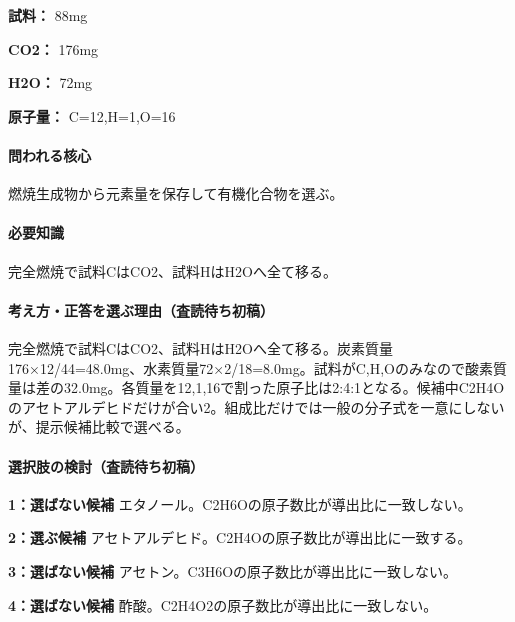 \noindent\textbf{試料：} 88mg\par

\noindent\textbf{CO2：} 176mg\par

\noindent\textbf{H2O：} 72mg\par

\noindent\textbf{原子量：} C=\allowbreak{}12,H=\allowbreak{}1,O=\allowbreak{}16\par

\paragraph{問われる核心} 燃焼生成物から元素量を保存して有機化合物を選ぶ。

\paragraph{必要知識} 完全燃焼で試料CはCO2、試料HはH2Oへ全て移る。

\paragraph{考え方・正答を選ぶ理由（査読待ち初稿）} 完全燃焼で試料CはCO2、試料HはH2Oへ全て移る。炭素質量176×12/44=\allowbreak{}48.0mg、水素質量72×2/18=\allowbreak{}8.0mg。試料がC,H,Oのみなので酸素質量は差の32.0mg。各質量を12,1,16で割った原子比は2:4:1となる。候補中C2H4Oのアセトアルデヒドだけが合い2。組成比だけでは一般の分子式を一意にしないが、提示候補比較で選べる。

\paragraph{選択肢の検討（査読待ち初稿）}\mbox{}\par

\noindent\textbf{1：選ばない候補} エタノール。C2H6Oの原子数比が導出比に一致しない。\par

\noindent\textbf{2：選ぶ候補} アセトアルデヒド。C2H4Oの原子数比が導出比に一致する。\par

\noindent\textbf{3：選ばない候補} アセトン。C3H6Oの原子数比が導出比に一致しない。\par

\noindent\textbf{4：選ばない候補} 酢酸。C2H4O2の原子数比が導出比に一致しない。\par

